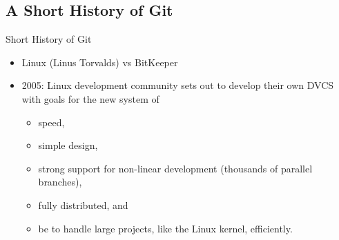 \subsection{A Short History of Git}
\begin{frame}[t]{Short History of Git}
  \begin{itemize}
    \item Linux (Linus Torvalds) vs BitKeeper
    \item 2005: Linux development community sets out to develop their own DVCS
      with goals for the new system of
      \begin{itemize}
        \item speed,
        \item simple design,
        \item strong support for non-linear development (thousands of parallel
          branches),
        \item fully distributed, and
        \item be to handle large projects, like the Linux kernel,
          efficiently.
      \end{itemize}
  \end{itemize}
\end{frame}

